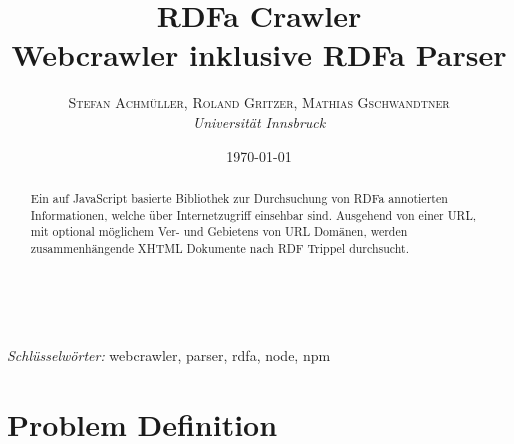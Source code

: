 \documentclass[hidelinks, a4paper, 11pt]{article} %
\title{\textbf{RDFa Crawler}\\ %
Webcrawler inklusive RDFa Parser} %
\author{\textsc{Stefan Achm\"uller, Roland Gritzer, Mathias Gschwandtner} %
\\{\textit{Universit\"at Innsbruck}}} %
\date{\today} %
\makeatletter
\renewcommand{\maketitle}{ %
\begin{flushright} %
{\LARGE\@title} %

\vspace{50pt} %

{\large\@author} %
\\\@date %

\vspace{40pt} %
\end{flushright}
}
\makeatother
\begin{document}
\maketitle %



\renewcommand{\abstractname}{Zusammenfassung} %

\begin{abstract}
Ein auf JavaScript basierte Bibliothek zur Durchsuchung von RDFa annotierten Informationen, welche \"uber Internetzugriff einsehbar sind. Ausgehend von einer URL, mit optional m\"oglichem Ver- und Gebietens von URL Dom\"anen, werden zusammenh\"angende XHTML Dokumente nach RDF Trippel durchsucht.
\end{abstract}

\hspace*{3,6mm}\textit{Schl\"usselw\"orter:} webcrawler, parser, rdfa, node, npm %

\vspace{30pt} %

\renewcommand{\contentsname}{Inhaltsangabe}

\tableofcontents
\newpage





\section{Problem Definition}
\end{document}
